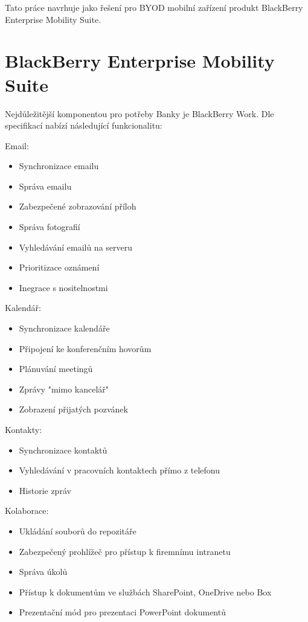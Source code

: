 Tato práce navrhuje jako řešení pro BYOD mobilní zařízení produkt BlackBerry Enterprise Mobility Suite.


\section{BlackBerry Enterprise Mobility Suite}

Nejdůležitější komponentou pro potřeby Banky je BlackBerry Work. Dle specifikací  nabízí následující funkcionalitu:

Email:
\begin{itemize}
    \item Synchronizace emailu
    \item Správa emailu
    \item Zabezpečené zobrazování příloh
    \item Správa fotografií
    \item Vyhledávání emailů na serveru
    \item Prioritizace oznámení
    \item Inegrace s nositelnostmi
\end{itemize}

Kalendář:
\begin{itemize}
 \item Synchronizace kalendáře
 \item Připojení ke konferenčním hovorům
 \item Plánuvání meetingů
 \item Zprávy "mimo kancelář"
 \item Zobrazení přijatých pozvánek
\end{itemize}

Kontakty:
\begin{itemize}
   \item Synchronizace kontaktů
   \item Vyhledávání v pracovních kontaktech přímo z telefonu
   \item Historie zpráv
\end{itemize}

Kolaborace:
\begin{itemize}
   \item Ukládání souborů do repozitáře
   \item Zabezpečený prohlížeč pro přístup k firemnímu intranetu
   \item Správa úkolů
   \item Přístup k dokumentům ve službách SharePoint, OneDrive nebo Box
   \item Prezentační mód pro prezentaci PowerPoint dokumentů
\end{itemize}

